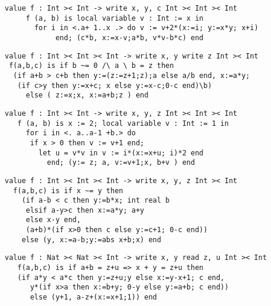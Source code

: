 \z \begin{lstlisting}
value f : Int >< Int -> write x, y, c Int >< Int >< Int
     f (a, b) is local variable v : Int := x in
       for i in <.a+ 1..x .> do v := v+2*(x:=i; y:=x*y; x+i)
            end; (c*b, x:=x-v;a*b, v*v-b*c) end
\end{lstlisting}

\z \begin{lstlisting}
value f : Int >< Int >< Int -> write x, y write z Int >< Int
 f(a,b,c) is if b ~= 0 /\ a \ b = z then
  (if a+b > c+b then y:=(z:=z+1;z);a else a/b end, x:=a*y;
   (if c>y then y:=x+c; x else y:=x-c;0-c end)\b)
     else ( z:=x;x, x:=a+b;z ) end
\end{lstlisting}

\z \begin{lstlisting}
value f : Int >< Int -> write x, y, z Int >< Int >< Int
   f (a, b) is x := 2; local variable v : Int := 1 in
     for i in <. a..a-1 +b.> do
      if x > 0 then v := v+1 end;
        let u = v*v in v := i*(x:=x+u; i)*2 end
          end; (y:= z; a, v:=v+1;x, b+v ) end
\end{lstlisting}

\z \begin{lstlisting}
value f : Int >< Int >< Int -> write x, y, z Int >< Int
  f(a,b,c) is if x ~= y then
    (if a-b < c then y:=b*x; int real b
     elsif a-y>c then x:=a*y; a+y
     else x-y end,
     (a+b)*(if x>0 then c else y:=c+1; 0-c end))
    else (y, x:=a-b;y:=abs x+b;x) end
\end{lstlisting}

\z \begin{lstlisting}
value f : Nat >< Nat >< Int -> write x, y read z, u Int >< Int
   f(a,b,c) is if a+b = z+u => x + y = z+u then
   (if a*y < a*c then y:=z+u;y else x:=y-x+1; c end,
      y*(if x>a then x:=b+y; 0-y else y:=a+b; c end))
      else (y+1, a-z+(x:=x+1;1)) end
\end{lstlisting}



